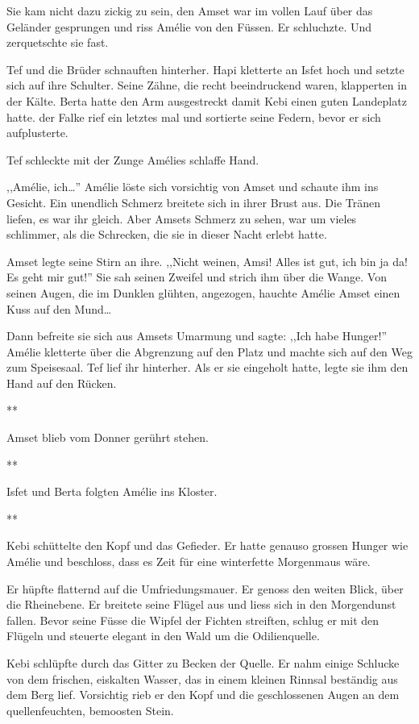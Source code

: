 \documentclass[11pt,titlepage,a5paper]{book}
\newcommand{\sterne}{\par{\centering ***\par}}
\begin{document}
Sie kam nicht dazu zickig zu sein, den Amset war im vollen Lauf über das Geländer gesprungen und riss Amélie von den Füssen. Er schluchzte. Und zerquetschte sie fast.

Tef und die Brüder schnauften hinterher. Hapi kletterte an Isfet hoch und setzte sich auf ihre Schulter. Seine Zähne, die recht beeindruckend waren, klapperten in der Kälte. Berta hatte den Arm ausgestreckt damit Kebi einen guten Landeplatz hatte. der Falke rief ein letztes mal und sortierte seine Federn, bevor er sich aufplusterte.

Tef schleckte mit der Zunge Amélies schlaffe Hand.

,,Amélie, ich\dots '' Amélie löste sich vorsichtig von Amset und schaute ihm ins Gesicht. Ein unendlich Schmerz breitete sich in ihrer Brust aus. Die Tränen liefen, es war ihr gleich. Aber Amsets Schmerz zu sehen, war um vieles schlimmer, als die Schrecken, die sie in dieser Nacht erlebt hatte.

Amset legte seine Stirn an ihre. ,,Nicht weinen, Amsi! Alles ist gut, ich bin ja da! Es geht mir gut!'' Sie sah seinen Zweifel und strich ihm über die Wange. Von seinen Augen, die im Dunklen glühten, angezogen, hauchte Amélie Amset einen Kuss auf den Mund\dots

Dann befreite sie sich aus Amsets Umarmung und sagte: ,,Ich habe Hunger!'' Amélie kletterte über die Abgrenzung auf den Platz und machte sich auf den Weg zum Speisesaal. Tef lief ihr hinterher. Als er sie eingeholt hatte, legte sie ihm den Hand auf den Rücken.

\sterne

Amset blieb vom Donner gerührt stehen. 

\sterne

Isfet und Berta folgten Amélie ins Kloster.

\sterne

Kebi schüttelte den Kopf und das Gefieder. Er hatte genauso grossen Hunger wie Amélie und beschloss, dass es Zeit für eine winterfette Morgenmaus wäre.

Er hüpfte flatternd auf die Umfriedungsmauer. Er genoss den weiten Blick, über die Rheinebene. Er breitete seine Flügel aus und liess sich in den Morgendunst fallen. Bevor seine Füsse die Wipfel der Fichten streiften, schlug er mit den Flügeln und steuerte elegant in den Wald um die Odilienquelle.

Kebi schlüpfte durch das Gitter zu Becken der Quelle. Er nahm einige Schlucke von dem frischen, eiskalten Wasser, das in einem kleinen Rinnsal beständig aus dem Berg lief. Vorsichtig rieb er den Kopf und die geschlossenen Augen an dem quellenfeuchten, bemoosten Stein. 
\end{document}
